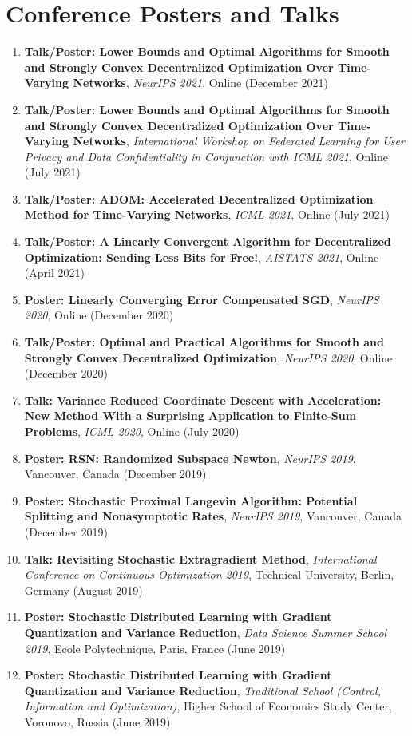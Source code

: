 \section{Conference Posters and Talks}
\begin{enumerate}
\item {\bf Talk/Poster: Lower Bounds and Optimal Algorithms for Smooth and Strongly Convex Decentralized Optimization Over Time-Varying Networks}, {\em NeurIPS 2021}, Online (December 2021)
\item {\bf Talk/Poster: Lower Bounds and Optimal Algorithms for Smooth and Strongly Convex Decentralized Optimization Over Time-Varying Networks}, {\em International Workshop on Federated Learning for User Privacy and Data Confidentiality in Conjunction with ICML 2021}, Online (July 2021)
\item {\bf Talk/Poster: ADOM: Accelerated Decentralized Optimization Method for Time-Varying Networks}, {\em ICML 2021}, Online (July 2021)
\item {\bf Talk/Poster: A Linearly Convergent Algorithm for Decentralized Optimization: Sending Less Bits for Free!}, {\em AISTATS 2021}, Online (April 2021)
\item {\bf Poster: Linearly Converging Error Compensated SGD}, {\em NeurIPS 2020}, Online (December 2020)
\item {\bf Talk/Poster: Optimal and Practical Algorithms for Smooth and Strongly Convex Decentralized Optimization}, {\em NeurIPS 2020}, Online (December 2020)
\item {\bf Talk: Variance Reduced Coordinate Descent with Acceleration: New Method With a Surprising Application to Finite-Sum Problems}, {\em ICML 2020}, Online (July 2020)
\item {\bf Poster: RSN: Randomized Subspace Newton}, {\em NeurIPS 2019}, Vancouver, Canada (December 2019)
\item {\bf Poster: Stochastic Proximal Langevin Algorithm: Potential Splitting and Nonasymptotic Rates}, {\em NeurIPS 2019}, Vancouver, Canada (December 2019)
\item {\bf Talk: Revisiting Stochastic Extragradient Method}, {\em International Conference on Continuous Optimization 2019}, Technical University, Berlin, Germany (August 2019)
\item {\bf Poster: Stochastic Distributed Learning with Gradient Quantization and Variance Reduction}, {\em Data Science Summer School 2019}, Ecole Polytechnique, Paris, France (June 2019)
\item {\bf Poster: Stochastic Distributed Learning with Gradient Quantization and Variance Reduction}, {\em Traditional School (Control, Information and Optimization)}, Higher School of Economics Study Center, Voronovo, Russia (June 2019)

\end{enumerate}
